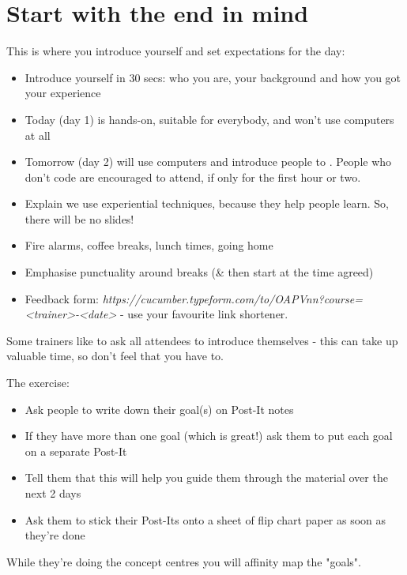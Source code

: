 \chapter*{Start with the end in mind}

\ifnotes
    This is where you introduce yourself and set expectations for the day:
    
    \begin{itemize}
        \item Introduce yourself in 30 secs: who you are, your background and how you got your experience
        \item Today (day 1) is hands-on, suitable for everybody, and won't use computers at all
        \item Tomorrow (day 2) will use computers and introduce people to \CUKE{}. People who don't code are encouraged to attend, if only for the first hour or two.
        \item Explain we use experiential techniques, because they help people learn. So, there will be no slides!
        \item Fire alarms, coffee breaks, lunch times, going home
        \item Emphasise punctuality around breaks (\& then start at the time agreed)
        \item Feedback form: \emph{https://cucumber.typeform.com/to/OAPVnn?course=<trainer>-<date>} - use your favourite link shortener.
    \end{itemize}
    
    Some trainers like to ask all attendees to introduce themselves - this can take up valuable time, so don't feel that you have to.
    
    The exercise:
    
    \begin{itemize}
        \item Ask people to write down their goal(s) on Post-It notes
        \item If they have more than one goal (which is great!) ask them to put each goal on a separate Post-It
        \item Tell them that this will help you guide them through the material over the next 2 days
        \item Ask them to stick their Post-Its onto a sheet of flip chart paper as soon as they're done
    \end{itemize}
    
    While they're doing the concept centres you will affinity map the "goals". 
    
